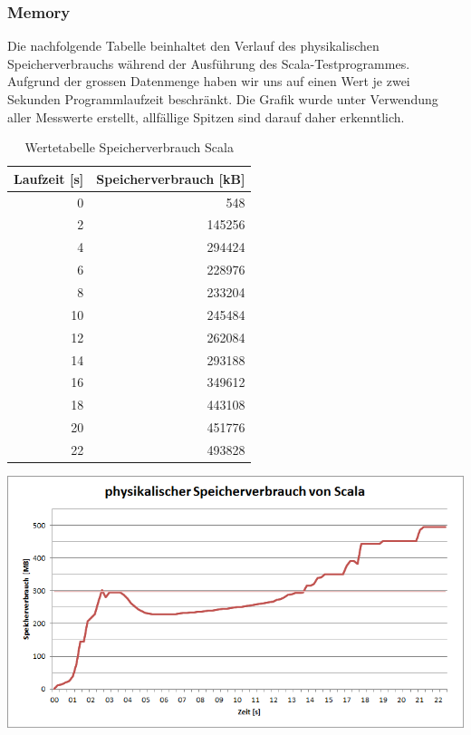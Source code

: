 \documentclass{fancydocument}
\begin{document}
\subsubsection{Memory}
Die nachfolgende Tabelle beinhaltet den Verlauf des physikalischen Speicherverbrauchs während der Ausführung des Scala-Testprogrammes. Aufgrund der grossen Datenmenge haben wir uns auf einen Wert je zwei Sekunden Programmlaufzeit beschränkt. Die Grafik wurde unter Verwendung aller Messwerte erstellt, allfällige Spitzen sind darauf daher erkenntlich.
\begin{table}[h!]
\centering
\begin{tabular}{|r|r|} \hline
\textbf{Laufzeit [s]} & \textbf{Speicherverbrauch [kB]}\\
\hline
0 & 548\\
\hline
2 & 145256\\
\hline
4 & 294424\\
\hline
6 & 228976\\
\hline
8 & 233204\\
\hline
10 & 245484\\
\hline
12 & 262084\\
\hline
14 & 293188\\
\hline
16 & 349612\\
\hline
18 & 443108\\
\hline
20 & 451776\\
\hline
22 & 493828\\
\hline
\end{tabular}
\caption{Wertetabelle Speicherverbrauch Scala}
\end{table}
\begin{center}
\includegraphics[width=\linewidth]{bilder/MemoryScala.png}
\end{center}
\end{document}
